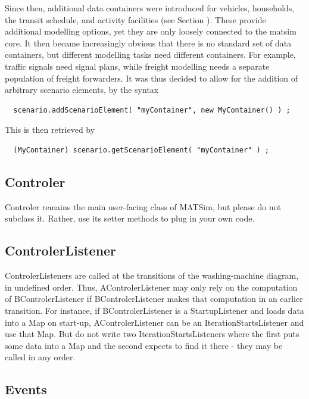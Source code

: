 Since then, additional data containers were introduced for vehicles, households, the transit schedule, and activity facilities (see Section ).  These provide additional modelling options, yet they are only loosely connected to the \acrshort{matsim} core.  It then became increasingly obvious that there is no standard set of data containers, but different modelling tasks need different containers.  For example, traffic signals need signal plans, while freight modelling needs a separate population of freight forwarders.  It was thus decided to allow for the addition of arbitrary scenario elements, by the syntax
\begin{lstlisting}
  scenario.addScenarioElement( "myContainer", new MyContainer() ) ;
\end{lstlisting}
This is then retrieved by
\begin{lstlisting}
  (MyContainer) scenario.getScenarioElement( "myContainer" ) ;
\end{lstlisting}

\subsection{Controler}
\label{sec:controlerextension}
Controler remains the main user-facing class of MATSim, but please do not subclass it. Rather,
use its setter methods to plug in your own code.

\subsection{ControlerListener}

ControlerListeners are called at the transitions of the washing-machine diagram, in undefined order.
Thus, AControlerListener may only rely on the computation of BControlerListener if BControlerListener
 makes that computation in an earlier transition. For instance, if BControlerListener is a StartupListener
 and loads data into a Map on start-up, AControlerListener can be an IterationStartsListener and use that Map.
 But do not write two IterationStartsListeners where the first puts some data into a Map and the second expects
 to find it there - they may be called in any order.

\subsection{Events}
\label{sec:events}
